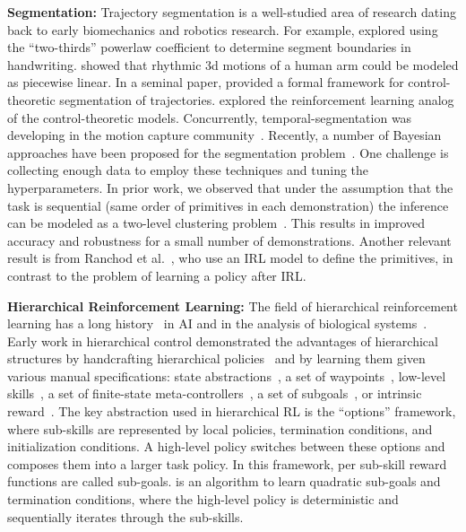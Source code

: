 \vspace{0.25em}\noindent\textbf{Segmentation: } Trajectory segmentation is a well-studied area of research dating back to early biomechanics and robotics research.
For example, \cite{viviani1985segmentation} explored using the ``two-thirds'' powerlaw coefficient to determine segment boundaries in handwriting.
\cite{morasso1983three} showed that rhythmic 3d motions of a human arm could be modeled as piecewise linear.
In a seminal paper, \cite{sternad1999segmentation} provided a formal framework for control-theoretic segmentation of trajectories.
\cite{botvinick2009hierarchically} explored the reinforcement learning analog of the control-theoretic models.
Concurrently, temporal-segmentation was developing in the motion capture community~\citep{moeslund2001survey}.
Recently, a number of Bayesian approaches have been proposed for the segmentation problem~\citep{asfour2006imitation,calinon2004stochastic,kruger2010learning, vakanski2012trajectory,tanwani2016learning}.
One challenge is collecting enough data to employ these techniques and tuning the hyperparameters.
In prior work, we observed that under the assumption that the task is sequential (same order of primitives in each demonstration) the inference can be modeled as a two-level clustering problem~\citep{krishnan2015tsc}.
This results in improved accuracy and robustness for a small number of demonstrations.
Another relevant result is from Ranchod et al.~\citep{ranchod2015nonparametric}, who use an IRL model to define the primitives, in contrast to the problem of learning a policy after IRL.

\vspace{0.25em}\noindent\textbf{Hierarchical Reinforcement Learning: } 
The field of hierarchical reinforcement learning has a long history~\citep{parr98,suttonPS99,barto03} in AI and in the analysis of biological systems~\citep{botvinick08,botvinick2009hierarchically,solway2014optimal,zacksKEH11,whitenFBL06}.
Early work in hierarchical control demonstrated the advantages of hierarchical structures by handcrafting hierarchical policies~\citep{brooks1986robust} and by learning them given various manual specifications: state abstractions~\citep{dayanH92,hengst02,kolterAN07,konidarisB07}, a set of waypoints~\citep{kaelbling93}, low-level skills~\citep{huberG97,baconP15,liaw17composing}, a set of finite-state meta-controllers~\citep{parrR97}, a set of subgoals~\citep{suttonPS99,dietterich00}, or intrinsic reward~\citep{kulkarni2016hierarchical}.
The key abstraction used in hierarchical RL is the ``options'' framework, where sub-skills are represented by local policies, termination conditions, and initialization conditions.
A high-level policy switches between these options and composes them into  a larger task policy.
In this framework, per sub-skill reward functions are called sub-goals. \hirl is an algorithm to learn quadratic sub-goals and termination conditions, where the high-level policy is deterministic and sequentially iterates through the sub-skills. 


